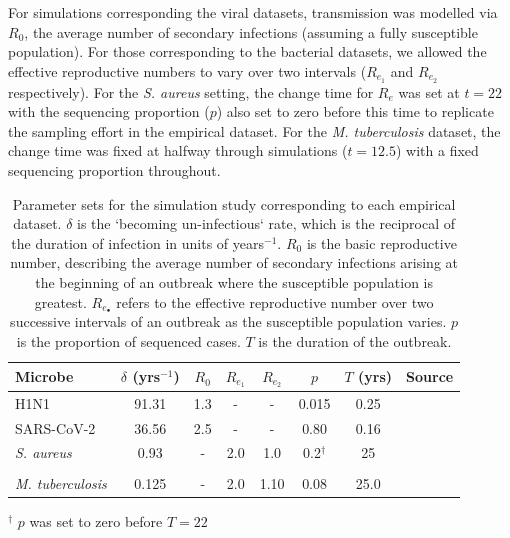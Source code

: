 \documentclass[12pt]{article}
\begin{document}
\begin{spacing}{2}
For simulations corresponding the viral datasets, transmission was modelled via $R_0$, the average number of secondary infections (assuming a fully susceptible population). For those corresponding to the bacterial datasets, we allowed the effective reproductive numbers to vary over two intervals ($R_{e_1}$ and $R_{e_2}$ respectively). For the \textit{S. aureus} setting, the change time for $R_e$ was set at $t=22$ with the sequencing proportion ($p$) also set to zero before this time to replicate the sampling effort in the empirical dataset. For the \textit{M. tuberculosis} dataset, the change time was fixed at halfway through simulations ($t=12.5$) with a fixed sequencing proportion throughout.

\begin{table}[H]
    \centering
    \caption{Parameter sets for the simulation study corresponding to each empirical dataset. $\delta$ is the `becoming un-infectious` rate, which is the reciprocal of the duration of infection in units of years$^{-1}$. $R_0$ is the basic reproductive number, describing the average number of secondary infections arising at the beginning of an outbreak where the susceptible population is greatest. $R_{e_\bullet}$ refers to the effective reproductive number over two successive intervals of an outbreak as the susceptible population varies. $p$ is the proportion of sequenced cases. $T$ is the duration of the outbreak.}
    \begin{tabular}{lccccccl}
    \toprule
    Microbe & $\delta$ (yrs$^{-1}$) & $R_0$ & $R_{e_1}$ & $R_{e_2}$ & $p$ & $T$ (yrs) & Source \\
    \midrule
    H1N1    & 91.31  & 1.3  & -   & -    & 0.015  & 0.25  & \citet{hedge_2013_real-time} \\
    SARS-CoV-2  & 36.56  & 2.5  & -   & -    & 0.80   & 0.16  & \citet{lane2021genomics} \\
    \textit{S. aureus}  & 0.93   & -    & 2.0 & 1.0  & 0.2$^{\dagger}$ & 25 &   \citet{duchene_2016_genome} \\ 
    &        &      &     &      &        &     & \citet{volz_modeling_2018} \\
    \textit{M. tuberculosis}    & 0.125  & -    & 2.0 & 1.10 & 0.08   & 25.0 &      \citet{kuhnert_tuberculosis_2018} \\
    \bottomrule
    \end{tabular}
    \label{tab:sim_parms}
\end{table}
\footnotesize
$^\dagger$ $p$ was set to zero before $T=22$
\normalsize


\end{spacing}
\end{document}
